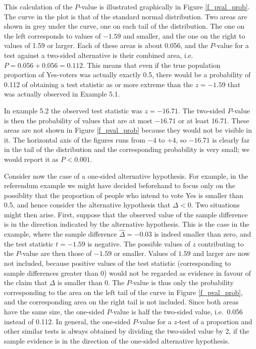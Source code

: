 This calculation of the $P$-value is illustrated graphically in Figure
\ref{f_pval_prob}. The curve in the plot is that of the standard normal
distribution. Two areas are shown in grey under the curve, one on each
tail of the distribution. The one on the left corresponds to values of
$-1.59$ and smaller, and the one on the right to values of 1.59 or
larger. Each of these areas is about 0.056, and the $P$-value for a test
against a two-sided alternative is their combined area, i.e.\
$P=0.056+0.056=0.112$. This means that even if the true population
proportion of Yes-voters was actually exactly 0.5, there would be a
probability of 0.112 of obtaining a test statistic as or more extreme
than the $z=-1.59$ that was actually observed in Example 5.1.

In example 5.2 the observed test statistic was $z=-16.71$. The
two-sided $P$-value is then the probability of values that are
at most $-16.71$ or at least 16.71. These areas are not shown in Figure
\ref{f_pval_prob} because they would not be visible in it. The horizontal
axis of the figures runs from $-4$ to $+4$, so $-16.71$ is clearly far
in the tail of the distribution and the corresponding probability is
very small; we would report it as $P<0.001$.

\label{p_onesided}
Consider now the case of a one-sided alternative hypothesis. For
example, in the referendum example we might have decided beforehand to
focus only on the possiblity that the proportion of people who intend to
vote Yes is smaller than 0.5, and hence consider the alternative
hypothesis that $\Delta<0$. Two situations might then arise. First,
suppose that the observed value of the sample difference is in the
direction indicated by the alternative hypothesis. This is the case in
the example, where the sample difference $\hat{\Delta}=-0.03$ is indeed
smaller than zero, and the test statistic $t=-1.59$ is negative. The
possible values of $z$ contributing to the $P$-value are then those of
$-1.59$ or smaller. Values of $1.59$ and larger are now not included,
because positive values of the test statistic (corresponding to sample
differences greater than 0) would not be regarded as evidence in favour
of the claim that $\Delta$ is smaller than 0. The $P$-value is thus only
the probability corresponding to the area on the left tail  of the curve
in Figure \ref{f_pval_prob}, and the corresponding area on the right
tail is not included. Since both areas have the same size, the one-sided
$P$-value is half the two-sided value, i.e.\ 0.056 instead of 0.112. In
general, the one-sided $P$-value for a $z$-test of a proportion and
other similar tests is always obtained by dividing the two-sided value
by 2, if the sample evidence is in the direction of the one-sided
alternative hypothesis.

